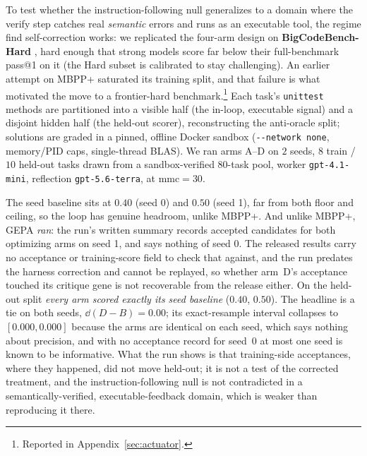 \documentclass[11pt]{article}
\begin{document}
To test whether the instruction-following null generalizes to a domain where the
verify step catches real \emph{semantic} errors and runs as an executable tool,
the regime \citet{shinn2023reflexion} find self-correction works: we replicated
the four-arm design on \textbf{BigCodeBench-Hard} \citep{zhuo2024bigcodebench}, hard
enough that strong models score far below their full-benchmark pass@1 on it (the Hard
subset is calibrated to stay challenging). An earlier attempt on MBPP+
\citep{liu2023evalplus} saturated its training split, and that failure is what motivated
the move to a frontier-hard benchmark.\footnote{Reported in Appendix~\ref{sec:actuator}.} Each task's \texttt{unittest} methods are partitioned into a visible half
(the in-loop, executable signal) and a disjoint hidden half (the held-out scorer),
reconstructing the anti-oracle split; solutions are graded in a pinned, offline Docker
sandbox (\texttt{-{}-network none}, memory/PID caps, single-thread BLAS). We ran arms
A--D on $2$ seeds, $8$ train / $10$ held-out tasks drawn from a sandbox-verified
$80$-task pool, worker \texttt{gpt-4.1-mini}, reflection \texttt{gpt-5.6-terra}, at
$\mathrm{mmc}=30$.

The seed baseline sits at $0.40$ (seed 0) and $0.50$ (seed 1), far from both floor
and ceiling, so the loop has genuine headroom, unlike MBPP+. And unlike MBPP+, GEPA
\emph{ran}: the run's written summary records accepted candidates for both optimizing arms on
seed 1, and says nothing of seed 0. The released results carry no acceptance or training-score field to
check that against, and the run predates the harness correction and cannot be replayed, so
whether arm~D's acceptance touched its critique gene is not recoverable from the release
either. On the held-out split
\emph{every arm scored exactly its seed baseline} ($0.40$, $0.50$). The headline is a tie on both
seeds, $\dd(D-B)=0.00$; its exact-resample interval collapses to $[0.000, 0.000]$ because the arms
are identical on each seed, which says nothing about precision, and with no acceptance record for
seed~0 at most one seed is known to be informative. What the run shows is that training-side acceptances, where they
happened, did not move held-out; it is not a test of the corrected treatment, and the
instruction-following null is not contradicted in a semantically-verified, executable-feedback
domain, which is weaker than reproducing it there.
\end{document}
